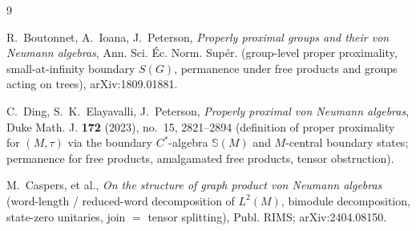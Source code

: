 \documentclass[11pt]{article}
\begin{document}
\begin{thebibliography}{9}

 R.~Boutonnet, A.~Ioana, J.~Peterson,
\emph{Properly proximal groups and their von Neumann algebras},
Ann. Sci. \'Ec. Norm. Sup\'er. (group-level proper proximality, small-at-infinity boundary $S(G)$,
permanence under free products and groups acting on trees), arXiv:1809.01881.

 C.~Ding, S.~K.~Elayavalli, J.~Peterson,
\emph{Properly proximal von Neumann algebras},
Duke Math. J. \textbf{172} (2023), no.~15, 2821--2894
(definition of proper proximality for $(M,\tau)$ via the boundary $C^*$-algebra $\mathbb S(M)$ and
$M$-central boundary states; permanence for free products, amalgamated free products, tensor obstruction).

 M.~Caspers, et al.,
\emph{On the structure of graph product von Neumann algebras}
(word-length / reduced-word decomposition of $L^2(M)$, bimodule decomposition, state-zero unitaries, join
$=$ tensor splitting), Publ. RIMS; arXiv:2404.08150.

\end{thebibliography}
\end{document}

